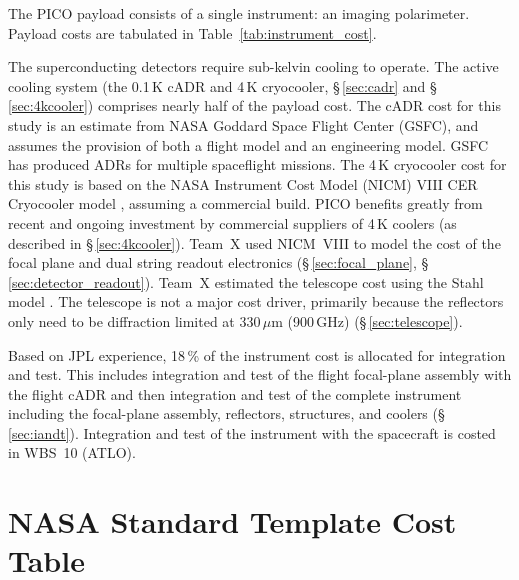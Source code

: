 

The PICO payload consists of a single instrument: an imaging
polarimeter. Payload costs are tabulated in
Table~\ref{tab:instrument_cost}.

The superconducting detectors require sub-kelvin cooling to
operate. The active cooling system (the 0.1\,K cADR and 4\,K
cryocooler, \S\,\ref{sec:cadr} and \S\,\ref{sec:4kcooler}) comprises nearly half of the payload
cost. The cADR cost for this study is an estimate from NASA Goddard
Space Flight Center (GSFC), and assumes the provision of both a flight
model and an engineering model. GSFC has produced ADRs for multiple
spaceflight missions. The 4\,K cryocooler cost for this study is based
on the NASA Instrument Cost Model (NICM) VIII CER Cryocooler model
\cite{Mrozinski2017}, assuming a commercial build. PICO benefits
greatly from recent and ongoing investment by commercial suppliers of
4\,K coolers (as described in \S\,\ref{sec:4kcooler}).  Team~X used NICM~VIII to model
the cost of the focal plane and dual string readout electronics (\S\,\ref{sec:focal_plane},
\S\,\ref{sec:detector_readout}).  Team~X estimated the telescope cost using the Stahl model
\cite{Stahl2016}. The telescope is not a major cost driver, primarily
because the reflectors only need to be diffraction limited at 330\,$\mu$m
(900\,GHz) (\S\,\ref{sec:telescope}).

Based on JPL experience, 18\,\% of the instrument cost is allocated
for integration and test. This includes integration and test of the
flight focal-plane assembly with the flight cADR and then integration
and test of the complete instrument including the focal-plane
assembly, reflectors, structures, and coolers (\S\,\ref{sec:iandt}). Integration and
test of the instrument with the spacecraft is costed in WBS~10
(ATLO).

\newpage


\section*{NASA Standard Template Cost Table}

